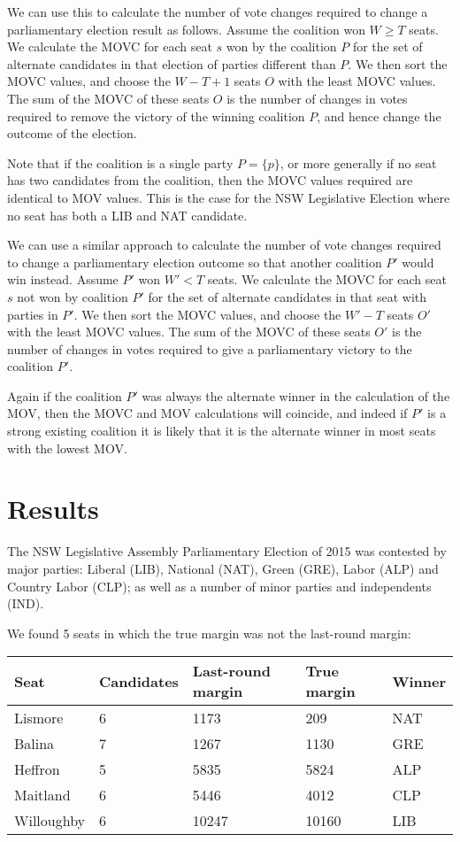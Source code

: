 \documentclass{article}
\begin{document}
We can use this to calculate the number of vote changes required to change a parliamentary election result as follows.
Assume the coalition won $W \geq T$ seats.
We calculate the MOVC for each seat $s$ won by the coalition $P$ for the set of alternate candidates in that election of parties different than $P$. We then sort the MOVC values, and choose the $W - T + 1$ seats $O$
with the least MOVC values. The sum of the MOVC of these seats $O$ is the number of changes in votes required to remove the victory of the winning coalition $P$, and hence change the outcome of the election.  

Note that if the coalition is a single party $P = \{p\}$, or more generally if no seat has two candidates from the coalition, then the MOVC values required are identical to MOV values.
This is the case for the NSW Legislative Election where no seat has both a LIB and NAT candidate.

We can use a similar approach to calculate the number of vote changes required to change a parliamentary election outcome
so that another coalition $P'$ would win instead. Assume $P'$ won $W' < T$ seats.
We calculate the MOVC for each seat $s$ not won by coalition $P'$ for the set of alternate candidates in that seat with parties in $P'$. We then sort the MOVC values, and choose the $W' - T$ seats $O'$ 
with the least MOVC values. The sum of the MOVC of these seats $O'$ is the number of changes in votes required to give a parliamentary victory to the coalition $P'$.

Again if the coalition $P'$ was always the alternate winner in the calculation of the MOV, then the MOVC and MOV calculations will coincide, and indeed if $P'$ is a strong existing coalition it is likely that it is the alternate winner in most seats with the lowest MOV. 



\section{Results}

The NSW Legislative Assembly Parliamentary Election of 2015 was contested by major parties:
Liberal (LIB), National (NAT), Green (GRE), Labor (ALP) and Country Labor (CLP); as
well as a number of minor parties and independents (IND). 

We found 5 seats in which the true margin was not the last-round margin: \\

\begin{tabular}{lllll}
Seat &  Candidates & Last-round margin & True margin & Winner \\
\hline
Lismore	& 6	& 1173 &	209 &	NAT \\
Balina &	7	& 1267 &	1130	& GRE \\
Heffron & 5 & 5835 & 5824 & ALP \\
Maitland &	6 &	5446 &	4012 &	CLP \\
Willoughby	& 6 &	10247 &	10160 &	LIB \\
\end{tabular}\\
\end{document}
